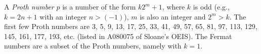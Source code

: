 \documentclass[12pt]{article}
\begin{document}
A {\em Proth number} $p$ is a number of the form $k2^m + 1$, where $k$ is odd (e.g., $k = 2n + 1$ with an integer $n > (-1)$), $m$ is also an integer and $2^m > k$. The first few Proth numbers are 3, 5, 9, 13, 17, 25, 33, 41, 49, 57, 65, 81, 97, 113, 129, 145, 161, 177, 193, etc. (listed in A080075 of Sloane's OEIS). The Fermat numbers are a subset of the Proth numbers, namely with $k = 1$.
\end{document}
